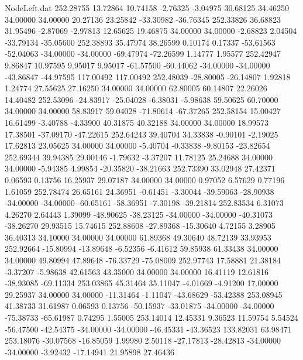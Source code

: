 \begin{filecontents}{NodeLeft.dat}
 252.28755   13.72864   10.74158    -2.76325   -3.04975   30.68125   34.46250   34.00000   34.00000   20.27136   23.25842  -33.30982  -36.76345
 252.33826   36.68823   31.95496    -2.87069   -2.97813   12.65625   19.46875   34.00000   34.00000   -2.68823    2.04504  -33.79134  -35.05600
 252.38893   35.47974   38.26599     0.10174    0.17337  -53.61563  -52.04063  -34.00000  -34.00000  -69.47974  -72.26599    1.14777    1.95577
 252.42947    9.86847   10.97595     9.95017    9.95017  -61.57500  -60.44062  -34.00000  -34.00000  -43.86847  -44.97595  117.00492  117.00492
 252.48039  -28.80005  -26.14807     1.92818    1.24774   27.55625   27.16250   34.00000   34.00000   62.80005   60.14807   22.26026   14.40482
 252.53096  -24.83917  -25.04028    -6.38031   -5.98638   59.50625   60.70000   34.00000   34.00000   58.83917   59.04028  -71.80614  -67.37265
 252.58154   15.00427   16.61499    -3.40788   -4.33900   40.31875   40.32188   34.00000   34.00000   18.99573   17.38501  -37.09170  -47.22615
 252.64243   39.40704   34.33838    -0.90101   -2.19025   17.62813   23.05625   34.00000   34.00000   -5.40704   -0.33838   -9.80153  -23.82654
 252.69344   39.94385   29.00146    -1.79632   -3.37207   11.78125   25.24688   34.00000   34.00000   -5.94385    4.99854  -20.35820  -38.21663
 252.73390   33.02948   27.42371     0.06593    0.13756   16.25937   29.07187   34.00000   34.00000    0.97052    6.57629    0.77196    1.61059
 252.78474   26.65161   24.36951    -0.61451   -3.30044  -39.59063  -28.90938  -34.00000  -34.00000  -60.65161  -58.36951   -7.30198  -39.21814
 252.83534    6.31073    4.26270     2.64443    1.39099  -48.90625  -38.23125  -34.00000  -34.00000  -40.31073  -38.26270   29.93515   15.74615
 252.88608  -27.89368  -15.30640     4.72155    3.28905   36.40313   34.10000   34.00000   34.00000   61.89368   49.30640   48.72139   33.93953
 252.92664  -15.80994  -13.89648    -6.52356   -6.41612   59.85938   61.33438   34.00000   34.00000   49.80994   47.89648  -76.33729  -75.08009
 252.97743   17.58881   21.38184    -3.37207   -5.98638   42.61563   43.35000   34.00000   34.00000   16.41119   12.61816  -38.93085  -69.11334
 253.03865   45.31464   35.11047    -4.01669   -4.91200   17.00000   29.25937   34.00000   34.00000  -11.31464   -1.11047  -43.68629  -53.42388
 253.08945   41.38733   31.61987     0.06593    0.13756  -50.15937  -33.01875  -34.00000  -34.00000  -75.38733  -65.61987    0.74295    1.55005
 253.14014   12.45331    9.36523    11.59754    5.54524  -56.47500  -42.54375  -34.00000  -34.00000  -46.45331  -43.36523  133.82031   63.98471
 253.18076  -30.07568  -16.85059     1.99980    2.50118  -27.17813  -28.42813  -34.00000  -34.00000   -3.92432  -17.14941   21.95898   27.46436

\end{filecontents}
